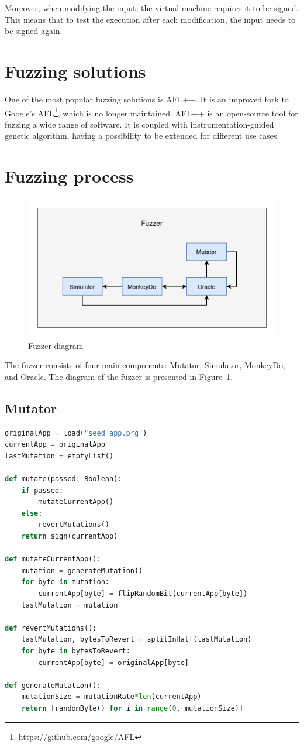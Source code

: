 Moreover, when modifying the input, the virtual machine requires it to be signed.
This means that to test the execution after each modification, the input needs to be signed again.


\section{Fuzzing solutions}
One of the most popular fuzzing solutions is AFL++\cite{aflplusplus}.
It is an improved fork to Google's AFL\footnote{\url{https://github.com/google/AFL}}, which is no longer maintained.
AFL++ is an open-source tool for fuzzing a wide range of software.
It is coupled with instrumentation-guided genetic algorithm, having a possibility to be extended for different use cases.

\section{Fuzzing process}
\begin{figure}[h]
    \centering
    \includegraphics[width=0.8\linewidth]{../../images/fuzzer-diagram}
    \caption{Fuzzer diagram}
    \label{fig:fuzzer-diagram}
\end{figure}

The fuzzer consists of four main components: Mutator, Simulator, MonkeyDo, and Oracle.
The diagram of the fuzzer is presented in Figure~\ref{fig:fuzzer-diagram}.
\subsection*{Mutator}
\begin{lstlisting}[caption={Pseudocode of the mutating algorithm},captionpos=b,label={lst:mutator},language=Python]
originalApp = load("seed_app.prg")
currentApp = originalApp
lastMutation = emptyList()

def mutate(passed: Boolean):
    if passed:
        mutateCurrentApp()
    else:
        revertMutations()
    return sign(currentApp)

def mutateCurrentApp():
    mutation = generateMutation()
    for byte in mutation:
        currentApp[byte] = flipRandomBit(currentApp[byte])
    lastMutation = mutation

def revertMutations():
    lastMutation, bytesToRevert = splitInHalf(lastMutation)
    for byte in bytesToRevert:
        currentApp[byte] = originalApp[byte]

def generateMutation():
    mutationSize = mutationRate*len(currentApp)
    return [randomByte() for i in range(0, mutationSize)]
\end{lstlisting}

